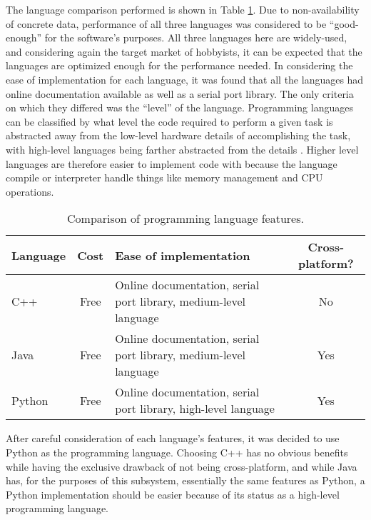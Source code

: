 The language comparison performed is shown in Table \ref{tab:languages features}. 
Due to non-availability of concrete data, performance of all three languages was 
considered to be ``good-enough'' for the software's purposes. All three languages here are 
widely-used, and considering again the target market of hobbyists, it can be expected 
that the languages are optimized enough for the performance needed. In considering the 
ease of implementation for each language, it was found that all the languages had online 
documentation available as well as a serial port library. The only criteria on which they
differed was the ``level'' of the language. Programming languages can be classified by what 
level the code required to perform a given task is abstracted away from the low-level 
hardware details of accomplishing the task, with high-level languages being farther 
abstracted from the details \cite{web:suranathesis}. Higher level languages are therefore 
easier to implement code with because the language compile or interpreter handle things 
like memory management and CPU operations.


\begin{table}[h]
\caption[Language features]{Comparison of programming language features.}
\begin{tabular}{l | c | p{6cm} | c}
	Language & Cost & Ease of implementation & Cross-platform? \\ 
	\hline
	C++ & Free & Online documentation, serial port library, medium-level language \cite{web:cpptut}\cite{web:cppserial} & No \\ 
	\hline
	Java & Free & Online documentation, serial port library, medium-level language \cite{web:javaapi}\cite{web:javaserial} & Yes \\
	\hline
	Python & Free & Online documentation, serial port library, high-level language \cite{web:pydoc}\cite{web:pyserial} & Yes \\
\end{tabular}
\label{tab:languages features}
\end{table}


After careful consideration of each language's features, it was decided to use Python as 
the programming language. Choosing C++ has no obvious benefits while having the exclusive 
drawback of not being cross-platform, and while Java has, for the purposes of this subsystem, 
essentially the same features as Python, a Python implementation should be easier because of 
its status as a high-level programming language.


